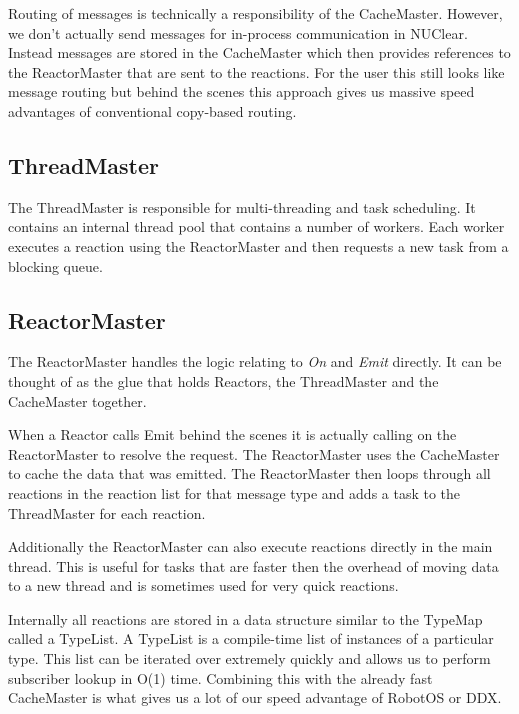 \documentclass[english,12pt]{scrartcl}
\begin{document}
				Routing of messages is technically a responsibility of the CacheMaster.
				However, we don't actually send messages for in-process communication in NUClear. 
				Instead messages are stored in the CacheMaster which then provides references to the ReactorMaster that are sent to the reactions.
				For the user this still looks like message routing but behind the scenes this approach gives us massive speed advantages of conventional copy-based routing.

			\subsection{ThreadMaster}				
				The ThreadMaster is responsible for multi-threading and task scheduling.
				It contains an internal thread pool that contains a number of workers. 
				Each worker executes a reaction using the ReactorMaster and then requests a new task from a blocking queue.
				
	
			\subsection{ReactorMaster}
				The ReactorMaster handles the logic relating to \emph{On} and \emph{Emit} directly. 
				It can be thought of as the glue that holds Reactors, the ThreadMaster and the CacheMaster together.
				
				When a Reactor calls Emit behind the scenes it is actually calling on the ReactorMaster to resolve the request.
				The ReactorMaster uses the CacheMaster to cache the data that was emitted.
				The ReactorMaster then loops through all reactions in the reaction list for that message type and adds a task to the ThreadMaster for each reaction.
				
				Additionally the ReactorMaster can also execute reactions directly in the main thread. 
				This is useful for tasks that are faster then the overhead of moving data to a new thread and is sometimes used for very quick reactions.
			
				Internally all reactions are stored in a data structure similar to the TypeMap called a TypeList. 
				A TypeList is a compile-time list of instances of a particular type. This list can be iterated over extremely quickly and allows us to perform subscriber lookup in O(1) time.
				Combining this with the already fast CacheMaster is what gives us a lot of our speed advantage of RobotOS or DDX.
		
\end{document}
